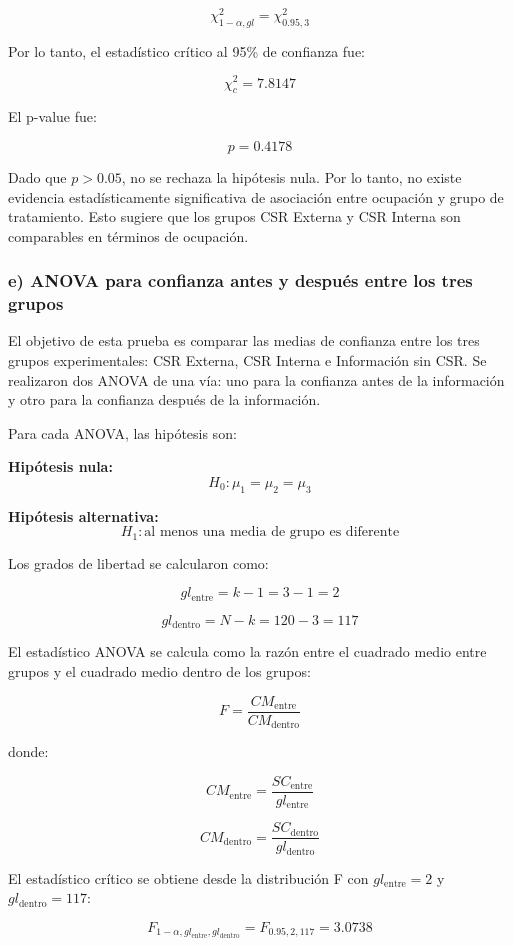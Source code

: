 \documentclass[12pt,letterpaper]{article}
\begin{document}
\[
\chi^2_{1-\alpha,gl} = \chi^2_{0.95,3}
\]

Por lo tanto, el estadístico crítico al 95\% de confianza fue:

\[
\chi^2_c = 7.8147
\]

El p-value fue:

\[
p = 0.4178
\]

Dado que \(p > 0.05\), no se rechaza la hipótesis nula. Por lo tanto, no existe evidencia estadísticamente significativa de asociación entre ocupación y grupo de tratamiento. Esto sugiere que los grupos CSR Externa y CSR Interna son comparables en términos de ocupación.

\subsubsection*{e) ANOVA para confianza antes y después entre los tres grupos}

El objetivo de esta prueba es comparar las medias de confianza entre los tres grupos experimentales: CSR Externa, CSR Interna e Información sin CSR. Se realizaron dos ANOVA de una vía: uno para la confianza antes de la información y otro para la confianza después de la información.

Para cada ANOVA, las hipótesis son:

\textbf{Hipótesis nula:}
\[
H_0: \mu_1 = \mu_2 = \mu_3
\]

\textbf{Hipótesis alternativa:}
\[
H_1: \text{al menos una media de grupo es diferente}
\]

Los grados de libertad se calcularon como:

\[
gl_{\text{entre}} = k - 1 = 3 - 1 = 2
\]

\[
gl_{\text{dentro}} = N - k = 120 - 3 = 117
\]

El estadístico ANOVA se calcula como la razón entre el cuadrado medio entre grupos y el cuadrado medio dentro de los grupos:

\[
F =
\frac{CM_{\text{entre}}}{CM_{\text{dentro}}}
\]

donde:

\[
CM_{\text{entre}} =
\frac{SC_{\text{entre}}}{gl_{\text{entre}}}
\]

\[
CM_{\text{dentro}} =
\frac{SC_{\text{dentro}}}{gl_{\text{dentro}}}
\]

El estadístico crítico se obtiene desde la distribución F con \(gl_{\text{entre}} = 2\) y \(gl_{\text{dentro}} = 117\):

\[
F_{1-\alpha,gl_{\text{entre}},gl_{\text{dentro}}}
=
F_{0.95,2,117}
= 3.0738
\]
\end{document}
